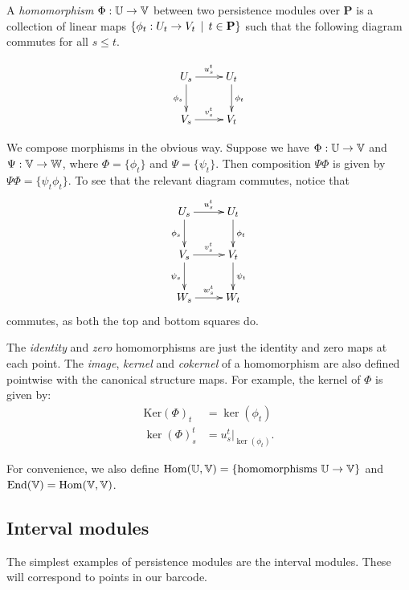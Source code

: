 \begin{definition}
A \emph{homomorphism} $\Phi : \mathbb{U} \to \mathbb{V}$ between two persistence modules over $\mathbf{P}$ is a collection of linear maps $\{ \phi_t : U_t \to V_t \, \mid \, t \in \mathbf{P} \}$ such that the following diagram commutes for all $s \leq t$. 

\begin{displaymath}
\xymatrix{
U_s \ar[d]_{\phi_s} \ar[r]^{u_s^t} & U_t \ar[d]^{\phi_t}\\
V_s \ar[r]^{v_s^t} & V_t
}
\end{displaymath}

We compose morphisms in the obvious way. Suppose we have $\Phi : \mathbb{U} \to \mathbb{V}$ and $\Psi : \mathbb{V} \to \mathbb{W}$, where $\Phi = \{\phi_t\}$ and $\Psi = \{\psi_t\}$. Then composition $\Psi \Phi$ is given by $\Psi \Phi = \{ \psi_t \phi_t \}$. To see that the relevant diagram commutes, notice that
\begin{displaymath}
\xymatrix{
U_s \ar[d]_{\phi_s} \ar[r]^{u_s^t} & U_t \ar[d]^{\phi_t}\\
V_s \ar[d]_{\psi_s} \ar[r]^{v_s^t} & V_t \ar[d]^{\psi_t}\\
W_s \ar[r]^{w_s^t} & W_t
}
\end{displaymath}
commutes, as both the top and bottom squares do.

The \emph{identity} and \emph{zero} homomorphisms are just the identity and zero maps at each point. The \emph{image}, \emph{kernel} and \emph{cokernel} of a homomorphism are also defined pointwise with the canonical structure maps. For example, the kernel of $\Phi$ is given by:
\begin{align*}
\text{Ker}(\Phi)_t &= \ker(\phi_t) \\
\ker(\Phi)_s^t &= u_s^t|_{\ker(\phi_t)}.
\end{align*}
\end{definition}

For convenience, we also define $\operatorname{Hom}(\mathbb{U}, \mathbb{V}) = \{ \text{homomorphisms } \mathbb{U}\to\mathbb{V} \}$ and $\operatorname{End}(\mathbb{V}) = \operatorname{Hom}(\mathbb{V}, \mathbb{V})$.

\subsection{Interval modules}

The simplest examples of persistence modules are the interval modules. These will correspond to points in our barcode.

